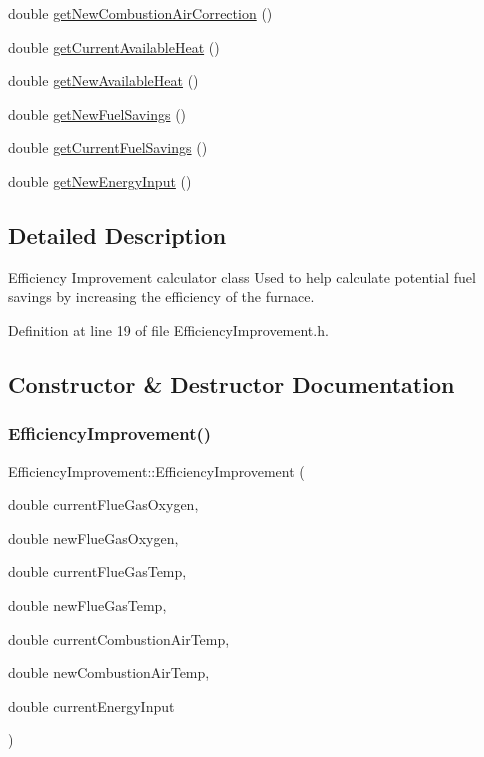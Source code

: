 \begin{DoxyCompactItemize}
double \hyperlink{class_efficiency_improvement_abcbe174b3f94a20679dff0f5bff6a330}{get\+New\+Combustion\+Air\+Correction} ()
\item 
double \hyperlink{class_efficiency_improvement_a4f1ef470ee88c9d3ac05be0bd5755157}{get\+Current\+Available\+Heat} ()
\item 
double \hyperlink{class_efficiency_improvement_a37df0eb5d1dc43627e947a610f2a9c08}{get\+New\+Available\+Heat} ()
\item 
double \hyperlink{class_efficiency_improvement_a1b85007b7b046b998443f5eb267822f9}{get\+New\+Fuel\+Savings} ()
\item 
double \hyperlink{class_efficiency_improvement_ab2e940be7192df960c9eb9578096796f}{get\+Current\+Fuel\+Savings} ()
\item 
double \hyperlink{class_efficiency_improvement_a3c31caaed812edb8c465b53dc9029810}{get\+New\+Energy\+Input} ()
\end{DoxyCompactItemize}


\subsection{Detailed Description}
Efficiency Improvement calculator class Used to help calculate potential fuel savings by increasing the efficiency of the furnace. 

Definition at line 19 of file Efficiency\+Improvement.\+h.



\subsection{Constructor \& Destructor Documentation}
\mbox{\label{class_efficiency_improvement_a84e4463e307cd280360a4dfbbb369c55}} 
\subsubsection{\texorpdfstring{Efficiency\+Improvement()}{EfficiencyImprovement()}\hspace{0.1cm}{\footnotesize\ttfamily [1/3]}}
{\footnotesize\ttfamily Efficiency\+Improvement\+::\+Efficiency\+Improvement (\begin{DoxyParamCaption}\item[{double}]{current\+Flue\+Gas\+Oxygen,  }\item[{double}]{new\+Flue\+Gas\+Oxygen,  }\item[{double}]{current\+Flue\+Gas\+Temp,  }\item[{double}]{new\+Flue\+Gas\+Temp,  }\item[{double}]{current\+Combustion\+Air\+Temp,  }\item[{double}]{new\+Combustion\+Air\+Temp,  }\item[{double}]{current\+Energy\+Input }\end{DoxyParamCaption})\hspace{0.3cm}{\ttfamily [inline]}}


